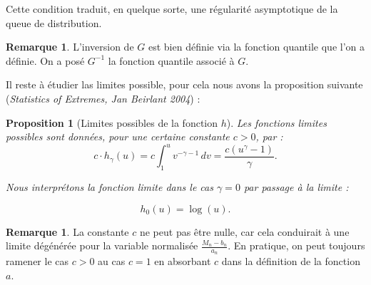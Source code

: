 \documentclass{article}
\theoremstyle{plain}
\theoremstyle{definition}
\newtheorem{remark}[definition]{Remarque}
\theoremstyle{plain}
\newtheorem{proposition}[definition]{Proposition}
\begin{document}
\noindent Cette condition traduit, en quelque sorte, une régularité asymptotique de la queue de distribution.


\begin{remark}
	L'inversion de $G$ est bien définie via la fonction quantile que l'on a définie. On a posé $G^{-1}$ la fonction quantile associé à $G$.
\end{remark}

\vspace{0.3cm}
\noindent Il reste à étudier las limites possible, pour cela nous avons la proposition suivante (\textit{Statistics of Extremes, Jan Beirlant 2004}) :
\vspace{0.3cm}
\begin{proposition}[Limites possibles de la fonction $h$]
Les fonctions limites possibles sont données, pour une certaine constante $c > 0$, par :
\[
c \cdot h_\gamma(u) = c \int_1^u v^{-\gamma - 1} \, dv = \frac{c(u^\gamma - 1)}{\gamma}.
\tag{2}
\]

\noindent Nous interprétons la fonction limite dans le cas $\gamma = 0$ par passage à la limite :

\[
h_0(u) = \log(u).
\]
\end{proposition}

\noindent
\begin{remark}
	La constante $c$ ne peut pas être nulle, car cela conduirait à une limite dégénérée pour la variable normalisée $\frac{M_n - b_n}{a_n}$. En pratique, on peut toujours ramener le cas $c > 0$ au cas $c = 1$ en absorbant $c$ dans la définition de la fonction $a$.
\end{remark}

\vspace{0.5cm}
\end{document}
